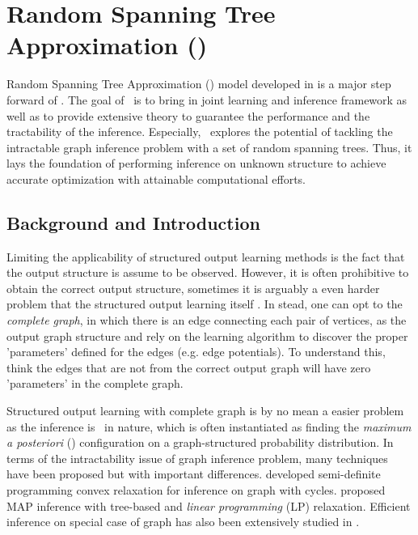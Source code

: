 {%
%
\section{Random Spanning Tree Approximation (\rta)}\label{sc_su14c}

Random Spanning Tree Approximation (\rta) model developed in  is a major step forward of \mam.
The goal of \rta\ is to bring in joint learning and inference framework as well as to provide extensive theory to guarantee the performance and the tractability of the inference.
Especially, \rta\ explores the potential of tackling the intractable graph inference problem with a set of random spanning trees.
Thus, it lays the foundation of performing inference on unknown structure to achieve accurate optimization with attainable computational efforts.

\subsection{Background and Introduction}

Limiting the applicability of structured output learning methods is the fact that the output structure is assume to be observed.
However, it is often prohibitive to obtain the correct output structure, sometimes it is arguably a even harder problem that the structured output learning itself \citep{Chickering94learning}.
In stead, one can opt to the \textit{complete graph}, in which there is an edge connecting each pair of vertices, as the output graph structure and rely on the learning algorithm to discover the proper 'parameters' defined for the edges (e.g. edge potentials).
To understand this, think the edges that are not from the correct output graph will have zero 'parameters' in the complete graph.

Structured output learning with complete graph is by no mean a easier problem as the inference is \nphard\ in nature, which is often instantiated as finding the \textit{maximum a posteriori} (\map) configuration on a graph-structured probability distribution.
In terms of the intractability issue of graph inference problem, many techniques have been proposed but with important differences.
\citet{Jordan04semiefinite} developed semi-definite programming convex relaxation for inference on graph with cycles.
\citet{Wainwright05map} proposed MAP inference with tree-based and \textit{linear programming} (LP) relaxation.
Efficient inference on special case of graph has also been extensively studied in \citep{Globerson07approximate}.

}
